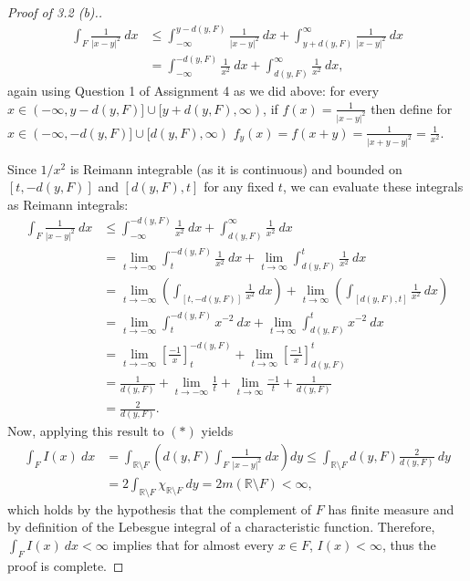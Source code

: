 \begin{proof}[Proof of 3.2 (b).]
\begin{align*}
	\int_{F} \frac{1}{|x-y|^{2} } \ dx &\leq \int_{-\infty} ^{y - d(y,F)} \frac{1}{|x-y|^{2} }  \ dx +  \int_{y+d(y,F)} ^{\infty} \frac{1}{|x-y|^{2} } \ dx \\
					   &= \int_{-\infty} ^{-d(y,F)} \frac{1}{x^{2} } \ dx + \int_{d(y,F)} ^{\infty} \frac{1}{x^{2} } \ dx,  
\end{align*}
again using Question 1 of Assignment 4 as we did above: for every \( x \in (-\infty, y - d(y,F)] \cup [y + d(y, F), \infty ) \), if \( f(x) = \frac{1}{|x-y|^{2} }  \) then define for \( x \in (-\infty, - d(y,F)] \cup [ d(y, F), \infty )  \) \( f_{y} (x) = f(x + y) = \frac{1}{|x+y-y|^{2} } = \frac{1}{x^{2} }  \).

Since \( 1/x^{2}  \) is Reimann integrable (as it is continuous) and bounded on \( [t, -d(y,F)] \) and \( [d(y,F), t] \) for any fixed \( t \), we can evaluate these integrals as Reimann integrals:
\begin{align*}
	\int_{F} \frac{1}{|x-y|^{2} } \ dx &\leq \int_{-\infty} ^{-d(y,F)} \frac{1}{x^{2} } \ dx + \int_{d(y,F)} ^{\infty} \frac{1}{x^{2} } \ dx \\
					   &= \lim_{{t} \to {-\infty}} \int_{t} ^{-d(y,F)} \frac{1}{x^{2} } \ dx + \lim_{{t} \to {\infty}} \int_{d(y,F)} ^{t} \frac{1}{x^{2} } \ dx \\ 
					   &= \lim_{{t} \to {-\infty}} \left ( {\int_{[t, -d(y,F)]} } \frac{1}{x^{2} } \ dx  \right ) + \lim_{{t} \to {\infty}} \left ( {\int_{[d(y,F), t]} } \frac{1}{x^{2} }  \ dx \right ) \tag{add endpoints as finite sets have measure 0} \\
				       &= \lim_{{t} \to {-\infty}} \int_{t} ^{-d(y,F)} x^{-2} \ dx + \lim_{{t} \to {\infty}} \int_{d(y,F)} ^{t} x^{-2} \ dx \\
				       &= \lim_{{t} \to {-\infty}} \left [ \frac{-1}{x}  \right]_{t}^{-d(y,F)} +  \lim_{{t} \to {\infty}} \left [ \frac{-1}{x}  \right]_{d(y,F)}^{t} \\
				       &= \frac{1}{d(y,F)} + \lim_{{t} \to {-\infty}} \frac{1}{t} + \lim_{{t} \to {\infty}} \frac{-1}{t} + \frac{1}{d(y,F)} \\
				       &= \frac{2}{d(y,F)}. 
\end{align*}
Now, applying this result to \((\ast)\) yields
\begin{align*}
	\int_{F} I(x) \ dx &= \int_{\mathbb{R}\setminus F} \left ( d(y,F) \int_{F} \frac{1}{|x-y|^{2} } \ dx \right ) dy \leq \int_{\mathbb{R} \setminus F} d(y,F)\frac{2}{d(y,F)} \ dy \\
		      &= 2 \int_{\mathbb{R} \setminus F} \chi_{\mathbb{R} \setminus F} \ dy = 2m(\mathbb{R}\setminus F) < \infty,  
\end{align*}
which holds by the hypothesis that the complement of \( F \) has finite measure and by definition of the Lebesgue integral of a characteristic function. Therefore, \( \int_{F} I(x) \ dx < \infty \) implies that for almost every \( x \in F \), \( I(x) < \infty \), thus the proof is complete.
\end{proof}
